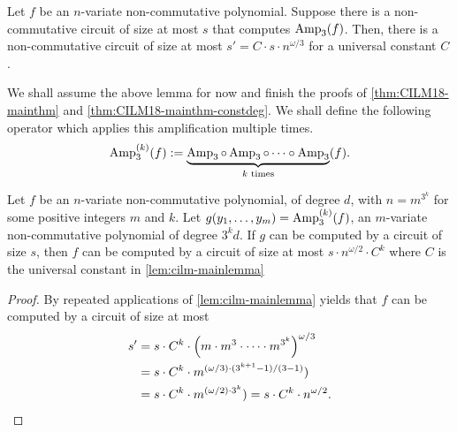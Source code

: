 \begin{lemma}\label{lem:cilm-mainlemma}
Let $f$ be an $n$-variate non-commutative polynomial. Suppose there is a non-commutative circuit of size at most $s$ that computes $\operatorname{Amp}_3(f)$. Then, there is a non-commutative circuit of size at most $s' = C \cdot s \cdot n^{\omega/3}$ for a universal constant $C$. 
\end{lemma}
We shall assume the above lemma for now and finish the proofs of \autoref{thm:CILM18-mainthm} and \autoref{thm:CILM18-mainthm-constdeg}. We shall define the following operator which applies this amplification multiple times. 
\[
  \operatorname{Amp}_3^{(k)}(f) := \underbrace{\operatorname{Amp}_3 \circ \operatorname{Amp}_3 \circ \cdots \circ \operatorname{Amp}_3}_{\text{$k$ times}} (f).\]
\begin{corollary}\label{cor:cilm-maincorr}
  Let $f$ be an $n$-variate non-commutative polynomial, of degree $d$, with $n = m^{3^k}$ for some positive integers $m$ and $k$. Let $g(y_1,\ldots, y_m) = \operatorname{Amp}_3^{(k)}(f)$, an $m$-variate non-commutative polynomial of degree $3^k d$. If $g$ can be computed by a circuit of size $s$, then $f$ can be computed by a circuit of size at most $s \cdot n^{\omega/2}\cdot C^k$ where $C$ is the universal constant in \autoref{lem:cilm-mainlemma}
\end{corollary}
\begin{proof}\belowdisplayskip=-12pt
  By repeated applications of \autoref{lem:cilm-mainlemma} yields that $f$ can be computed by a circuit of size at most
  \begin{align*}
    s' & = s \cdot C^k \cdot \left(m \cdot m^3 \cdot \cdots \cdot m^{3^k}\right)^{\omega/3}\\
       & = s \cdot C^k \cdot m^{(\omega/3) \cdot (3^{k+1} - 1)/(3 - 1)})\\
       & = s \cdot C^k \cdot m^{(\omega/2) \cdot 3^k}) = s \cdot C^k \cdot n^{\omega/2}.
  \end{align*}
\end{proof}

